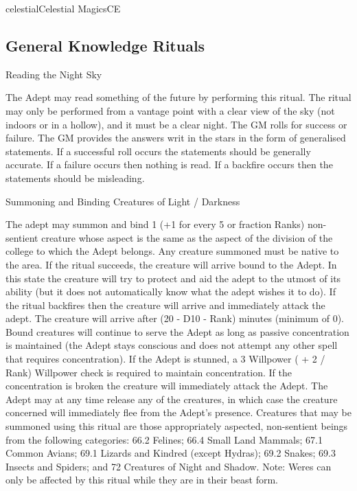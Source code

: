 \begin{college}[1.3]{celestial}{Celestial Magics}{CE}
\subsection{General Knowledge Rituals}

\begin{ritual}[Q-1]{Reading the Night Sky}

\begin{effects}
The Adept may read something of the future by performing this ritual.
The ritual may only be performed from a vantage point with a clear
view of the sky (not indoors or in a hollow), and it must be a clear
night. The GM rolls for success or failure.  The GM provides the
answers writ in the stars in the form of generalised statements.  If a
successful roll occurs the statements should be generally accurate.
If a failure occurs then nothing is read.  If a backfire occurs then
the statements should be misleading.
\end{effects}
\end{ritual}

\begin{ritual}[Q-2]{Summoning and Binding Creatures of Light / Darkness}

\begin{effects}
The adept may summon and bind 1 (+1 for every 5 or fraction Ranks)
non-sentient creature whose aspect is the same as the aspect of the
division of the college to which the Adept belongs.  Any creature
summoned must be native to the area.  If the ritual succeeds, the
creature will arrive bound to the Adept. In this state the creature
will try to protect and aid the adept to the utmost of its ability
(but it does not automatically know what the adept wishes it to do).
If the ritual backfires then the creature will arrive and immediately
attack the adept.  The creature will arrive after (20 - D10 - Rank)
minutes (minimum of 0).  Bound creatures will continue to serve the
Adept as long as passive concentration is maintained (the Adept stays
conscious and does not attempt any other spell that requires
concentration).  If the Adept is stunned, a 3 \x Willpower ( + 2 /
Rank) Willpower check is required to maintain concentration.  If the
concentration is broken the creature will immediately attack the
Adept.  The Adept may at any time release any of the creatures, in
which case the creature concerned will immediately flee from the
Adept's presence.  Creatures that may be summoned using this ritual
are those appropriately aspected, non-sentient beings from the
following categories: 66.2 Felines; 66.4 Small Land Mammals; 67.1
Common Avians; 69.1 Lizards and Kindred (except Hydras); 69.2 Snakes;
69.3 Insects and Spiders; and 72 Creatures of Night and Shadow.  Note:
Weres can only be affected by this ritual while they are in their
beast form.
\end{effects}
\end{ritual}


\end{college}
